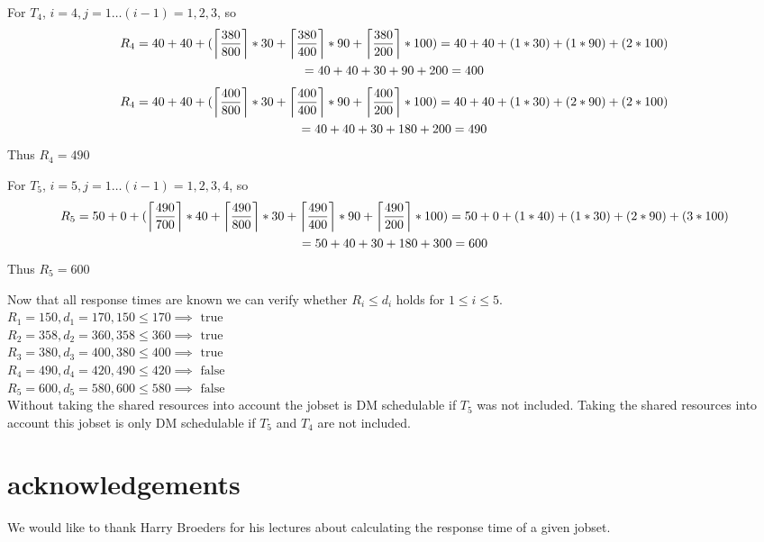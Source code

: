 \documentclass[10pt]{article}
\DeclarePairedDelimiter\ceil{\lceil}{\rceil}
\begin{document}
For $T_4$, $i=4, j=1\dots (i-1) = 1,2,3$, so
\begin{multline}
    R_4 = 40 + 40 + (\ceil*{\frac{380}{800}} * 30 + \ceil*{\frac{380}{400}} * 90 + \ceil*{\frac{380}{200}} * 100) = 40 + 40 + (1 * 30) + (1 * 90) + (2 * 100) \\ = 40 + 40 + 30 + 90 + 200 = 400
\end{multline}
\begin{multline}
    R_4 = 40 + 40 + (\ceil*{\frac{400}{800}} * 30 + \ceil*{\frac{400}{400}} * 90 + \ceil*{\frac{400}{200}} * 100) = 40 + 40 + (1 * 30) + (2 * 90) + (2 * 100) \\ = 40 + 40 + 30 + 180 + 200 = 490 
\end{multline}
Thus $R_4 = 490$

For $T_5$, $i=5, j=1\dots (i-1) = 1,2,3,4$, so
\begin{multline}
R_5 = 50 + 0 + (\ceil*{\frac{490}{700}} * 40 + \ceil*{\frac{490}{800}} * 30 + \ceil*{\frac{490}{400}} * 90 + \ceil*{\frac{490}{200}} * 100) = 50 + 0 + (1 * 40) + (1 * 30) + (2 * 90) + (3 * 100) \\ = 50 + 40 + 30 + 180 + 300 = 600
\end{multline}
Thus $R_5 = 600$

Now that all response times are known we can verify whether $R_i \leq d_i$ holds for $1 \leq i \leq 5$.\\
$R_1 = 150, d_1 = 170, 150 \leq 170 \implies \text{ true }$ \\
$R_2 = 358, d_2 = 360, 358 \leq 360 \implies \text{ true }$ \\
$R_3 = 380, d_3 = 400, 380 \leq 400 \implies \text{ true }$ \\
$R_4 = 490, d_4 = 420, 490 \leq 420 \implies \text{ false}$ \\
$R_5 = 600, d_5 = 580, 600 \leq 580 \implies \text{ false}$ \\
Without taking the shared resources into account the jobset is DM schedulable if $T_5$ was not included.
Taking the shared resources into account this jobset is only DM schedulable if $T_5$ and $T_4$ are not included.

\section*{acknowledgements}
We would like to thank Harry Broeders for his lectures about calculating the response time of a given jobset.
\end{document}
